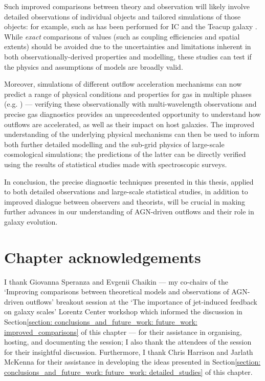Such improved comparisons between theory and observation will likely involve detailed observations of individual objects and tailored simulations of those objects: for example, such as has been performed for IC \citep{Morganti2015, Mukherjee2018} and the Teacup galaxy \citep{Audibert2023}. While \textit{exact} comparisons of values (such as coupling efficiencies and spatial extents) should be avoided due to the uncertainties and limitations inherent in both observationally-derived properties and modelling, these studies can test if the physics and assumptions of models are broadly valid.

Moreover, simulations of different outflow acceleration mechanisms can now predict a range of physical conditions and properties for gas in multiple phases (e.g. \citealt{Richings2021, Meenakshi2022a, Meenakshi2022b}) --- verifying these observationally with multi-wavelength observations and precise gas diagnostics provides an unprecedented opportunity to understand how outflows are accelerated, as well as their impact on host galaxies. The improved understanding of the underlying physical mechanisms can then be used to inform both further detailed modelling and the sub-grid physics of large-scale cosmological simulations; the predictions of the latter can be directly verified using the results of statistical studies made with spectroscopic surveys.

In conclusion, the precise diagnostic techniques presented in this thesis, applied to both detailed observations and large-scale statistical studies, in addition to improved dialogue between observers and theorists, will be crucial in making further advances in our understanding of AGN-driven outflows and their role in galaxy evolution.

\vfill

\section*{Chapter acknowledgements}

I thank Giovanna Speranza and Evgenii Chaikin --- my co-chairs of the `Improving comparisons between theoretical models and observations of AGN-driven outflows' breakout session at the `The importance of jet-induced feedback on galaxy scales' Lorentz Center workshop which informed the discussion in Section\;\ref{section: conclusions_and_future_work: future_work: improved_comparisons} of this chapter --- for their assistance in organising, hosting, and documenting the session; I also thank the attendees of the session for their insightful discussion. Furthermore, I thank Chris Harrison and Jarlath McKenna for their assistance in developing the ideas presented in Section\;\ref{section: conclusions_and_future_work: future_work: detailed_studies} of this chapter.